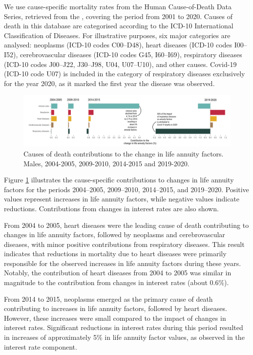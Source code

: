 \documentclass[12pt]{article}
\begin{document}
We use cause-specific mortality rates from the Human Cause-of-Death Data Series, retrieved from the \citet{HCD2024}, covering the period from 2001 to 2020. Causes of death in this database are categorised according to the ICD-10 International Classification of Diseases. For illustrative purposes, six major categories are analysed: neoplasms (ICD-10 codes C00–D48), heart diseases (ICD-10 codes I00–I52), cerebrovascular diseases (ICD-10 codes G45, I60–I69), respiratory diseases (ICD-10 codes J00–J22, J30–J98, U04, U07–U10), and other causes. Covid-19 (ICD-10 code U07) is included in the category of respiratory diseases exclusively for the year 2020, as it marked the first year the disease was observed.

\begin{figure}[H]
	\centering
	\includegraphics[width=1\linewidth]{Fig/attributionCauseOfDeathInLine}
	\caption{{Causes of death contributions to the change in life annuity factors. Males, 2004-2005, 2009-2010, 2014-2015 and 2019-2020.}}
	\label{fig:Fig7}
\end{figure}

Figure \ref{fig:Fig7} illustrates the cause-specific contributions to changes in life annuity factors for the periods 2004–2005, 2009–2010, 2014–2015, and 2019–2020. Positive values represent increases in life annuity factors, while negative values indicate reductions. Contributions from changes in interest rates are also shown.

From 2004 to 2005, heart diseases were the leading cause of death contributing to changes in life annuity factors, followed by neoplasms and cerebrovascular diseases, with minor positive contributions from respiratory diseases. This result indicates that reductions in mortality due to heart diseases were primarily responsible for the observed increases in life annuity factors during these years. Notably, the contribution of heart diseases from 2004 to 2005 was similar in magnitude to the contribution from changes in interest rates (about 0.6\%).

From 2014 to 2015, neoplasms emerged as the primary cause of death contributing to increases in life annuity factors, followed by heart diseases. However, these increases were small compared to the impact of changes in interest rates. Significant reductions in interest rates during this period resulted in increases of approximately 5\% in life annuity factor values, as observed in the interest rate component.
\end{document}

